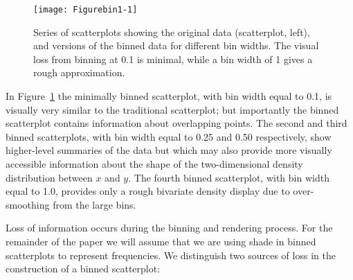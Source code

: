 \documentclass[11pt]{isuthesis}\usepackage[]{graphicx}\usepackage[]{color}
\newenvironment{knitrout}{}{} %
\begin{document}
\begin{figure}[hbtp]
\begin{minipage}{.645\linewidth}
\begin{minipage}{.495\linewidth}
\begin{knitrout}
{}



\end{knitrout}
\end{minipage}\hfil
\begin{minipage}{.495\linewidth}
\begin{knitrout}
\color{fgcolor}

{\centering \texttt{[image: Figurebin1-1]} 

}



\end{knitrout}
\end{minipage}
\end{minipage}
\caption{\label{binning}Series of scatterplots showing the original data (scatterplot, left), and versions of the binned data for different bin widths. The visual loss from binning at 0.1 is minimal, while a bin width of 1 gives a rough approximation.}
\end{figure}

In Figure~\ref{binning} the minimally binned scatterplot, with bin width equal to 0.1, is visually very similar to the traditional scatterplot; but importantly the binned scatterplot contains information about overlapping points. The second and third binned scatterplots, with bin width equal to 0.25 and 0.50 respectively, show higher-level summaries of the data but which may also provide more visually accessible information about the shape of the two-dimensional density distribution between $x$ and $y$. The fourth binned scatterplot, with bin width equal to 1.0, provides only a rough bivariate density display due to over-smoothing from the large bins. 

Loss of information occurs during the binning and rendering process. For the remainder of the paper we will assume that we are using shade in binned scatterplots to represent frequencies.  We distinguish two sources of loss in the construction of a binned scatterplot:
\end{document}
